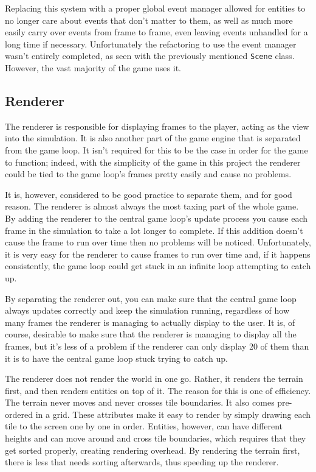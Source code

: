 Replacing this system with a proper global event manager allowed for entities to no longer care about events that don't matter to them, as well as much more easily carry over events from frame to frame, even leaving events unhandled for a long time if necessary. Unfortunately the refactoring to use the event manager wasn't entirely completed, as seen with the previously mentioned \texttt{Scene} class. However, the vast majority of the game uses it.

\subsection{Renderer}\label{design_renderer}
The renderer is responsible for displaying frames to the player, acting as the view into the simulation. It is also another part of the game engine that is separated from the game loop. It isn't required for this to be the case in order for the game to function; indeed, with the simplicity of the game in this project the renderer could be tied to the game loop's frames pretty easily and cause no problems.

It is, however, considered to be good practice to separate them, and for good reason. The renderer is almost always the most taxing part of the whole game. By adding the renderer to the central game loop's update process you cause each frame in the simulation to take a lot longer to complete. If this addition doesn't cause the frame to run over time then no problems will be noticed. Unfortunately, it is very easy for the renderer to cause frames to run over time and, if it happens consistently, the game loop could get stuck in an infinite loop attempting to catch up.

By separating the renderer out, you can make sure that the central game loop always updates correctly and keep the simulation running, regardless of how many frames the renderer is managing to actually display to the user. It is, of course, desirable to make sure that the renderer is managing to display all the frames, but it's less of a problem if the renderer can only display 20 of them than it is to have the central game loop stuck trying to catch up.

The renderer does not render the world in one go. Rather, it renders the terrain first, and then renders entities on top of it. The reason for this is one of efficiency. The terrain never moves and never crosses tile boundaries. It also comes pre-ordered in a grid. These attributes make it easy to render by simply drawing each tile to the screen one by one in order. Entities, however, can have different heights and can move around and cross tile boundaries, which requires that they get sorted properly, creating rendering overhead. By rendering the terrain first, there is less that needs sorting afterwards, thus speeding up the renderer.

